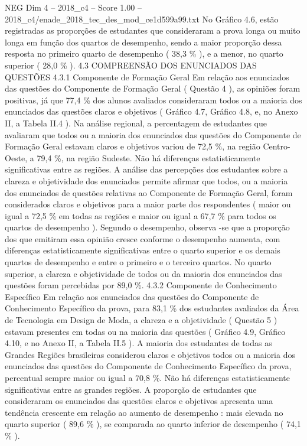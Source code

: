 \begin{textsample}{NEG Dim 4 – 2018\_c4 – Score 1.00 – 2018\_c4/enade\_2018\_tec\_des\_mod\_ce1d599a99.txt}
No Gráfico 4.6, estão registradas as proporções de estudantes que consideraram a prova longa ou muito longa em função dos quartos de desempenho, sendo a maior proporção dessa resposta no primeiro quarto de desempenho ( 38,3 \% ), e a menor, no quarto superior ( 28,0 \% ). 4.3 COMPREENSÃO DOS ENUNCIADOS DAS QUESTÕES 4.3.1 Componente de Formação Geral Em relação aos enunciados das questões do Componente de Formação Geral ( Questão 4 ), as opiniões foram positivas, já que 77,4 \% dos alunos avaliados consideraram todos ou a maioria dos enunciados das questões claros e objetivos ( Gráfico 4.7, Gráfico 4.8, e, no Anexo II, a Tabela II.4 ).
Na análise regional, a percentagem de estudantes que avaliaram que todos ou a maioria dos enunciados das questões do Componente de Formação Geral estavam claros e objetivos variou de 72,5 \%, na região Centro-Oeste, a 79,4 \%, na região Sudeste.
Não há diferenças estatisticamente significativas entre as regiões.
A análise das percepções dos estudantes sobre a clareza e objetividade dos enunciados permite afirmar que todos, ou a maioria dos enunciados de questões relativas ao Componente de Formação Geral, foram considerados claros e objetivos para a maior parte dos respondentes ( maior ou igual a 72,5 \% em todas as regiões e maior ou igual a 67,7 \% para todos os quartos de desempenho ).
Segundo o desempenho, observa -se que a proporção dos que emitiram essa opinião cresce conforme o desempenho aumenta, com diferenças estatisticamente significativas entre o quarto superior e os demais quartos de desempenho e entre o primeiro e o terceiro quartos.
No quarto superior, a clareza e objetividade de todos ou da maioria dos enunciados das questões foram percebidas por 89,0 \%. 4.3.2 Componente de Conhecimento Específico Em relação aos enunciados das questões do Componente de Conhecimento Específico da prova, para 83,1 \% dos estudantes avaliados da Área de Tecnologia em Design de Moda, a clareza e a objetividade ( Questão 5 ) estavam presentes em todas ou na maioria das questões ( Gráfico 4.9, Gráfico 4.10, e no Anexo II, a Tabela II.5 ).
A maioria dos estudantes de todas as Grandes Regiões brasileiras considerou claros e objetivos todos ou a maioria dos enunciados das questões do Componente de Conhecimento Específico da prova, percentual sempre maior ou igual a 70,8 \%.
Não há diferenças estatisticamente significativas entre as grandes regiões.
A proporção de estudantes que consideraram os enunciados das questões claros e objetivos apresenta uma tendência crescente em relação ao aumento de desempenho : mais elevada no quarto superior ( 89,6 \% ), se comparada ao quarto inferior de desempenho ( 74,1 \% ).

\end{textsample}

